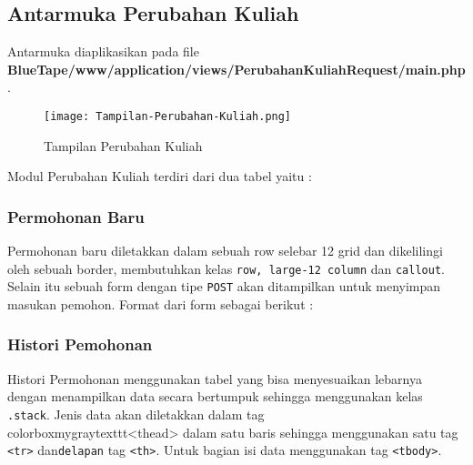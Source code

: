 \subsection{Antarmuka Perubahan Kuliah}
Antarmuka diaplikasikan pada file \textbf{BlueTape/www/application/views/PerubahanKuliahRequest/main.php}.
\begin{figure} [H]
	\centering  
	\texttt{[image: Tampilan-Perubahan-Kuliah.png]}  
	\caption{Tampilan Perubahan Kuliah} 
\end{figure}
Modul Perubahan Kuliah terdiri dari dua tabel yaitu :


\subsubsection{Permohonan Baru}
Permohonan baru diletakkan dalam sebuah row selebar 12 grid dan dikelilingi oleh sebuah border, membutuhkan kelas \colorbox{mygray}{\texttt{row, large-12 column}} dan \texttt{callout}. Selain itu sebuah form dengan tipe \texttt{POST} akan ditampilkan untuk menyimpan masukan pemohon. Format dari form sebagai berikut :



\subsubsection{Histori Pemohonan}
Histori Permohonan menggunakan tabel yang bisa menyesuaikan lebarnya dengan menampilkan data secara bertumpuk sehingga menggunakan kelas \colorbox{mygray}{\texttt{.stack}}. Jenis data akan diletakkan dalam tag \\colorbox{mygray}{texttt{<thead>}} dalam satu baris sehingga menggunakan satu tag \colorbox{mygray}{\texttt{<tr>}} dan\texttt{delapan} tag \colorbox{mygray}{\texttt{<th>}}. Untuk bagian isi data menggunakan tag \colorbox{mygray}{\texttt{<tbody>}}.

